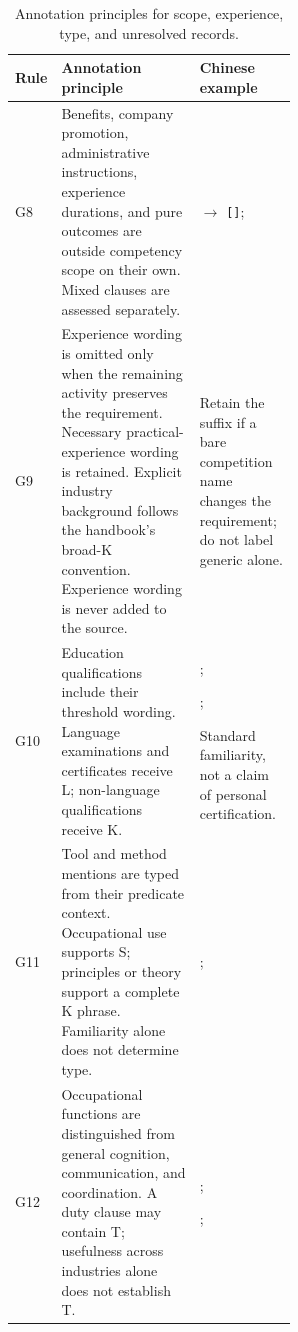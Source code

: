 \endgroup

\begingroup
\small\setlength{\tabcolsep}{4pt}\renewcommand{\arraystretch}{1.13}
\begin{table}[H]
\small
\caption{Annotation principles for scope, experience, type, and unresolved records.}\label{tab:guide-scope}
\begin{tabular}{@{}P{0.07\linewidth}P{0.49\linewidth}P{\linewidth-16pt\relax}@{}}
\toprule\textbf{Rule} & \textbf{Annotation principle} & \textbf{Chinese example}\\\midrule

G8 & Benefits, company promotion, administrative instructions, experience durations, and pure outcomes are outside competency scope on their own. Mixed clauses are assessed separately. &  $\rightarrow$ \texttt{[]};\par\smallskip{} \\[5pt]
G9 & Experience wording is omitted only when the remaining activity preserves the requirement. Necessary practical-experience wording is retained. Explicit industry background follows the handbook's broad-K convention. Experience wording is never added to the source. & \par\smallskip Retain the suffix if a bare competition name changes the requirement; do not label generic  alone. \\[5pt]
G10 & Education qualifications include their threshold wording. Language examinations and certificates receive L; non-language qualifications receive K. & ;\par\smallskip{};\par\smallskip{}\par\smallskip Standard familiarity, not a claim of personal certification. \\[5pt]
G11 & Tool and method mentions are typed from their predicate context. Occupational use supports S; principles or theory support a complete K phrase. Familiarity alone does not determine type. & ;\par\smallskip{} \\[5pt]
G12 & Occupational functions are distinguished from general cognition, communication, and coordination. A duty clause may contain T; usefulness across industries alone does not establish T. & ;\par\smallskip{};\par\smallskip{} \\[5pt]

\end{tabular}
\end{table}
